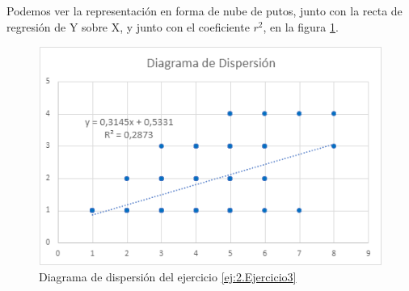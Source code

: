 \begin{ejercicio}
\begin{enumerate}
        Podemos ver la representación en forma de nube de putos, junto con la recta de regresión de Y sobre X, y junto con el coeficiente $r^2$, en la figura \ref{fig:ej3:DiagDispersion}.
        \begin{figure}[H]
            \centering
            \includegraphics[width=0.6\linewidth]{Imagenes/Ej3.png}
            \caption{Diagrama de dispersión del ejercicio \ref{ej:2.Ejercicio3}}
            \label{fig:ej3:DiagDispersion}
        \end{figure}
    \end{enumerate}
\end{ejercicio}

